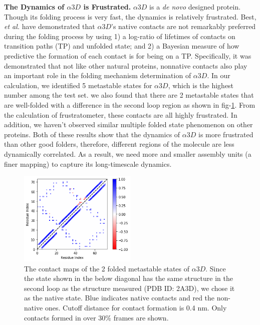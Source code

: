 \documentclass[journal=jacsat,manuscript=article]{achemso}
\begin{document}
{\bf The Dynamics of $\alpha 3D$ is Frustrated.} $\alpha 3D$ is a {\it de novo} designed protein\cite{A3D_de_novo}. Though its folding process is very fast\cite{A3D_fast_folder}, the dynamics is relatively frustrated. Best, {\it et al.} have demonstrated that $\alpha 3D$'s native contacts are not remarkably preferred during the folding process by using 1) a log-ratio of lifetimes of contacts on transition paths (TP) and unfolded state; and 2) a Bayesian measure of how predictive the formation of each contact is for being on a TP. Specifically, it was demonstrated that not like other natural proteins, nonnative contacts also play an important role in the folding mechanism determination of $\alpha 3D$\cite{A3D_frustration}. In our calculation, we identified 5 metastable states for $\alpha 3D$, which is the highest number among the test set. we also found that there are 2 metastable states that are well-folded with a difference in the second loop region as shown in fig-\ref{A3D_contact}. From the calculation of frustratometer, these contacts are all highly frustrated\cite{Justin_frustration}. In addition, we haven't observed similar multiple folded state phenomenon on other proteins. Both of these results show that the dynamics of $\alpha 3D$ is more frustrated than other good folders, therefore, different regions of the molecule are less dynamically correlated. As a result, we need more and smaller assembly units (a finer mapping) to capture its long-timescale dynamics. 

\begin{figure}[htbp]
  \centering
  \includegraphics[width=0.5\textwidth]{A3D_contact_HMM_5_state_4_contacts.png}
  \caption{\label{A3D_contact}The contact maps of the 2 folded metastable states of $\alpha 3D$. Since the state shown in the below diagonal has the same structure in the second loop as the structure measured (PDB ID: 2A3D), we chose it as the native state. Blue indicates native contacts and red the non-native ones. Cutoff distance for contact formation is 0.4 nm. Only contacts formed in over $30\%$ frames are shown.}
\end{figure}
\end{document}

